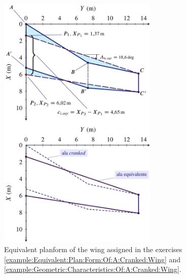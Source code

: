 \documentclass[[12pt,twoside]{book}
\begin{document}
\begin{figure}[t]%
  \centering
    \includegraphics[width=0.68\textwidth]{Chapter_2/equivalent_plan_form_of_a_cranked_wing/wing_planform_basic_3_drawing.pdf}
  \caption{
           Equivalent planform of the wing assigned in the exercises  \ref{example:Equivalent:Plan:Form:Of:A:Cranked:Wing} and \ref{example:Geometric:Characteristics:Of:A:Cranked:Wing}.
  }
  \label{fig:Cranked:Wing:Planform:Results:B}%
\end{figure}
%

%
\end{document}
